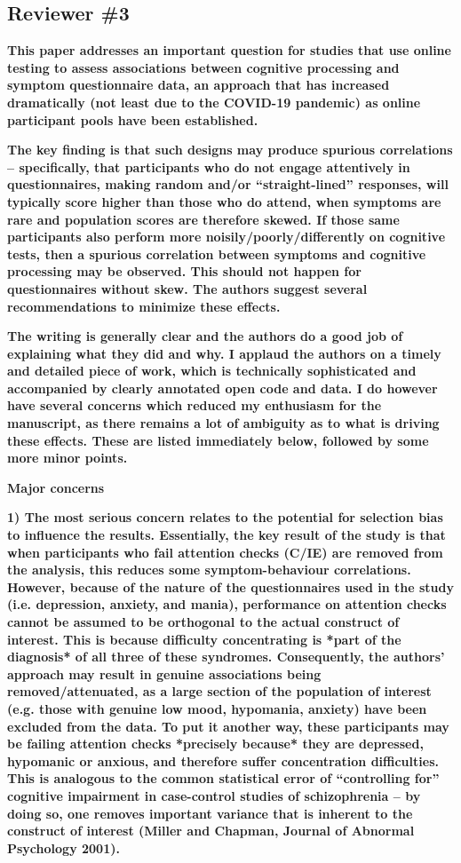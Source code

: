 \documentclass[a4paper,notitlepage,12pt]{article}
\begin{document}
\subsection*{Reviewer \#3}

\textbf{This paper addresses an important question for studies that use online testing to assess associations between cognitive processing and symptom questionnaire data, an approach that has increased dramatically (not least due to the COVID-19 pandemic) as online participant pools have been established.}

\textbf{The key finding is that such designs may produce spurious correlations – specifically, that participants who do not engage attentively in questionnaires, making random and/or ``straight-lined'' responses, will typically score higher than those who do attend, when symptoms are rare and population scores are therefore skewed. If those same participants also perform more noisily/poorly/differently on cognitive tests, then a spurious correlation between symptoms and cognitive processing may be observed. This should not happen for questionnaires without skew. The authors suggest several recommendations to minimize these effects.}

\textbf{The writing is generally clear and the authors do a good job of explaining what they did and why. I applaud the authors on a timely and detailed piece of work, which is technically sophisticated and accompanied by clearly annotated open code and data. I do however have several concerns which reduced my enthusiasm for the manuscript, as there remains a lot of ambiguity as to what is driving these effects. These are listed immediately below, followed by some more minor points.}

\textbf{Major concerns}

\textbf{1) The most serious concern relates to the potential for selection bias to influence the results. Essentially, the key result of the study is that when participants who fail attention checks (C/IE) are removed from the analysis, this reduces some symptom-behaviour correlations. However, because of the nature of the questionnaires used in the study (i.e. depression, anxiety, and mania), performance on attention checks cannot be assumed to be orthogonal to the actual construct of interest. This is because difficulty concentrating is *part of the diagnosis* of all three of these syndromes. Consequently, the authors' approach may result in genuine associations being removed/attenuated, as a large section of the population of interest (e.g. those with genuine low mood, hypomania, anxiety) have been excluded from the data. To put it another way, these participants may be failing attention checks *precisely because* they are depressed, hypomanic or anxious, and therefore suffer concentration difficulties. This is analogous to the common statistical error of ``controlling for'' cognitive impairment in case-control studies of schizophrenia – by doing so, one removes important variance that is inherent to the construct of interest (Miller and Chapman, Journal of Abnormal Psychology 2001).}
\end{document}
